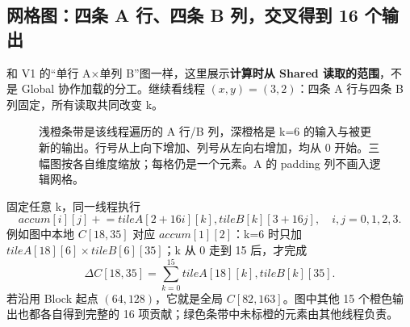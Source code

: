 \subsection{网格图：四条 A 行、四条 B 列，交叉得到 16 个输出}
和 V1 的“单行 A×单列 B”图一样，这里展示\textbf{计算时从 Shared 读取的范围}，不是 Global 协作加载的分工。继续看线程 $(x,y)=(3,2)$：四条 A 行与四条 B 列固定，所有读取共同改变 k。
\begin{figure}[H]\centering

\caption{浅橙条带是该线程遍历的 A 行/B 列，深橙格是 k=6 的输入与被更新的输出。行号从上向下增加、列号从左向右增加，均从 0 开始。三幅图按各自维度缩放；每格仍是一个元素。A 的 padding 列不画入逻辑网格。}
\end{figure}
固定任意 k，同一线程执行
\[
accum[i][j]\mathrel{+}=tileA[2+16i][k],tileB[k][3+16j],\quad i,j=0,1,2,3.
\]
例如图中本地 $C[18,35]$ 对应 $accum[1][2]$：k=6 时只加 $tileA[18][6]\times tileB[6][35]$；k 从 0 走到 15 后，才完成
\[
\Delta C[18,35]=\sum_{k=0}^{15}tileA[18][k],tileB[k][35].
\]
若沿用 Block 起点 $(64,128)$，它就是全局 $C[82,163]$。图中其他 15 个橙色输出也都各自得到完整的 16 项贡献；绿色条带中未标橙的元素由其他线程负责。
\pagebreakhere

